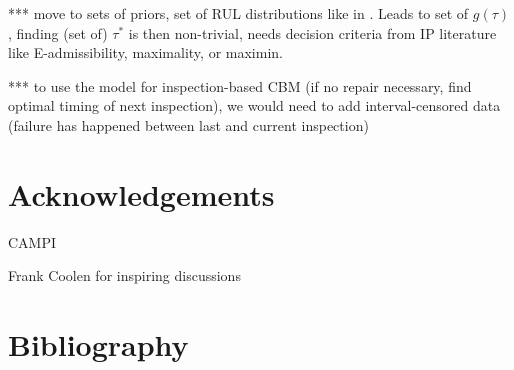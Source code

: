 \documentclass[authoryear]{elsarticle}
\begin{document}
*** move to sets of priors, set of RUL distributions like in \cite{2016:walter-coolen}.
Leads to set of $g(\tau)$, finding (set of) $\tau^*$ is then non-trivial,
needs decision criteria from IP literature like E-admissibility, maximality, or maximin.

*** to use the model for inspection-based CBM (if no repair necessary, find optimal timing of next inspection),
we would need to add interval-censored data (failure has happened between last and current inspection)



\section*{Acknowledgements}

CAMPI

Frank Coolen for inspiring discussions

\section*{Bibliography}




\end{document}
